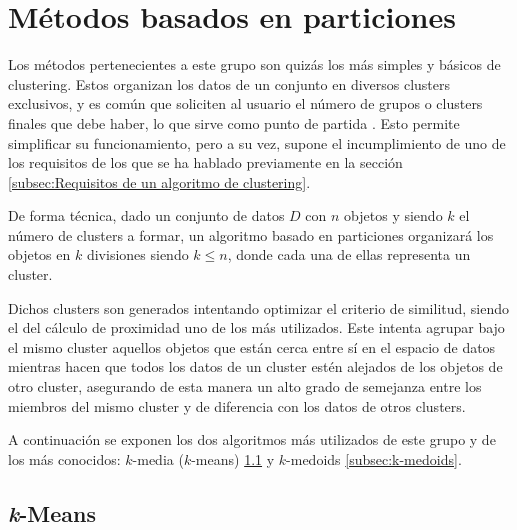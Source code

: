 \documentclass[10pt, a4paper]{article}
\begin{document}

\section{Métodos basados en particiones} \label{sec:Métodos basados en particiones}

\cite{LIBRO} Los métodos pertenecientes a este grupo son quizás los más simples y básicos de clustering. Estos organizan los datos de un conjunto en diversos clusters exclusivos, y es común que soliciten al usuario el número de grupos o clusters finales que debe haber, lo que sirve como punto de partida . Esto permite simplificar su funcionamiento, pero a su vez, supone el incumplimiento de uno de los requisitos de los que se ha hablado previamente en la sección \ref{subsec:Requisitos de un algoritmo de clustering}.

De forma técnica, dado un conjunto de datos $D$ con $n$ objetos y siendo $k$ el número de clusters a formar, un algoritmo basado en particiones organizará los objetos en $k$ divisiones siendo $k \leq n$, donde cada una de ellas representa un cluster. 

Dichos clusters son generados intentando optimizar el criterio de similitud, siendo el del cálculo de proximidad uno de los más utilizados. Este intenta agrupar bajo el mismo cluster aquellos objetos que están cerca entre sí en el espacio de datos mientras hacen que todos los datos de un cluster estén alejados de los objetos de otro cluster, asegurando de esta manera un alto grado de semejanza entre los miembros del mismo cluster y de diferencia con los datos de otros clusters.

A continuación se exponen los dos algoritmos más utilizados de este grupo y de los más conocidos: $k$-media ($k$-means) \ref{subsec:k-means} y $k$-medoids \ref{subsec:k-medoids}.




\subsection{\textbf{\textit{k}-Means}} \label{subsec:k-means}
\end{document}
